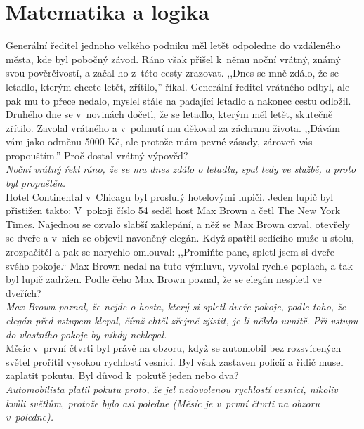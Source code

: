 
\section{Matematika a logika}
\begin{multicols}{\value{columnsgames}}

\noindent
Generální ředitel jednoho velkého podniku měl letět odpoledne
do vzdáleného města, kde byl pobočný závod. Ráno však přišel
k~němu noční vrátný, známý svou pověrčivostí, a začal
ho z~této cesty zrazovat. ,,Dnes se mně zdálo, že se letadlo,
kterým chcete letět, zřítilo,'' říkal. Generální ředitel vrátného
odbyl, ale pak mu to přece nedalo, myslel stále na padající letadlo
a nakonec cestu odložil. Druhého dne se v~novinách dočetl,
že se letadlo, kterým měl letět, skutečně zřítilo. Zavolal vrátného
a v~pohnutí mu děkoval za záchranu života. ,,Dávám vám
jako odměnu 5000 Kč, ale protože mám pevné zásady, zároveň vás
propouštím.'' Proč dostal vrátný výpověď?\\[1 mm]
{\sl Noční vrátný řekl ráno, že se mu dnes zdálo o letadlu, spal
tedy ve službě, a proto byl propuštěn.}\\

\noindent
Hotel Continental v~Chicagu byl proslulý hotelovými
lupiči. Jeden lupič byl přistižen takto: V~pokoji číslo
54 seděl host Max Brown a četl The New York Times. Najednou se
ozvalo slabší zaklepání, a něž se Max Brown ozval, otevřely se
dveře a v~nich se objevil navoněný elegán. Když spatřil
sedícího muže u stolu, zrozpačitěl a pak se narychlo omlouval:
,,Promiňte pane, spletl jsem si dveře svého pokoje.`` Max Brown
nedal na tuto výmluvu, vyvolal rychle poplach, a tak byl lupič
zadržen. Podle čeho Max Brown poznal, že se elegán nespletl ve
dveřích?\\[1 mm]
{\sl Max Brown poznal, že nejde o hosta, který si spletl dveře
pokoje, podle toho, že elegán před vstupem klepal, čímž chtěl
zřejmě zjistit, je-li někdo uvnitř. Při vstupu do vlastního pokoje
by nikdy neklepal.}\\

\noindent
Měsíc v~první čtvrti byl právě na obzoru, když
se automobil bez rozsvícených světel prořítil vysokou rychlostí
vesnicí. Byl však zastaven policií a řidič musel zaplatit pokutu.
Byl důvod k~pokutě jeden nebo dva?\\[1 mm]
{\sl Automobilista platil pokutu proto, že jel nedovolenou rychlostí
vesnicí, nikoliv kvůli světlům, protože bylo asi poledne (Měsíc
je v~první čtvrti na obzoru v~poledne).}\\


\end{multicols}

